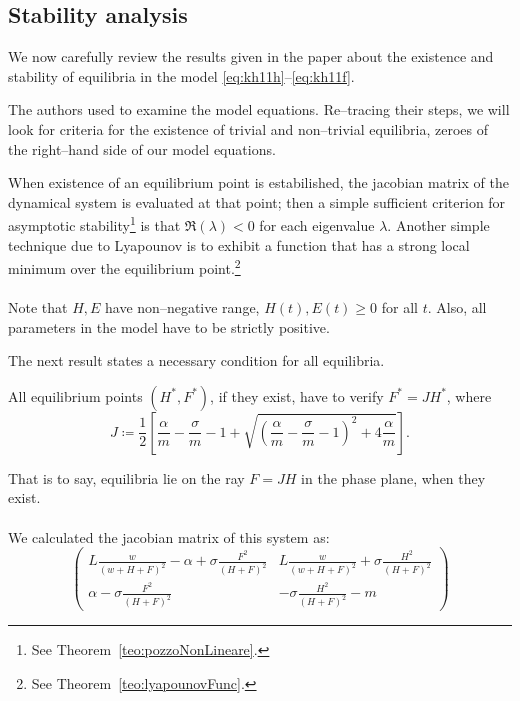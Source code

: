 \subsection{Stability analysis}
We now carefully review the results given in the paper about the existence and stability of equilibria in the model \eqref{eq:kh11h}--\eqref{eq:kh11f}.

The authors used  to examine the model equations.
Re--tracing their steps, we will look for criteria for the existence of trivial and non--trivial equilibria, \ie zeroes of the right--hand side of our model equations.

When existence of an equilibrium point is estabilished, the jacobian matrix of the dynamical system is
evaluated at that point; then a simple sufficient criterion for asymptotic
stability\footnote{See Theorem~\ref{teo:pozzoNonLineare}.}
is that $\Re (\lambda) < 0$ for each eigenvalue $\lambda$.
Another simple technique due to Lyapounov is to exhibit a function that has a strong local minimum
over the equilibrium point.\footnote{See Theorem~\ref{teo:lyapounovFunc}.}

\paragraph{}
Note that $H, E$ have non--negative range, \ie $H(t), E(t) \geq 0$ for all $t$.
Also, all parameters in the model have to be strictly positive.

The next result states a necessary condition for all equilibria.

\begin{lemma}
    \label{lem:necessJ}
    All equilibrium points $(H^*, F^*)$, if they exist, have to verify $F^* = J H^*$, where
    \begin{equation}
        J \coloneq \frac{1}{2} \left[
            \frac{\alpha}{m} - \frac{\sigma}{m} - 1 +
            \sqrt{ {\left( \frac{\alpha}{m} - \frac{\sigma}{m} - 1 \right)}^2
                + 4 \frac{\alpha}{m}
            }
        \right].
        \label{eq:kh11posEqJ}
    \end{equation}
\end{lemma}

That is to say, equilibria lie on the ray $F= JH$ in the phase plane, when they exist.

\paragraph{}
We calculated the jacobian matrix of this system as:
\begin{equation}
    \begin{pmatrix}
        L \frac{w}{{(w + H + F)}^2} - \alpha + \sigma \frac{F^2}{{(H+F)}^2} &
        L \frac{w}{{(w + H + F)}^2} + \sigma \frac{H^2}{{(H+F)}^2}
        \\
        \alpha - \sigma \frac{F^2}{{(H+F)}^2} &
        - \sigma \frac{H^2}{{(H+F)}^2} - m
    \end{pmatrix}
    \label{eq:jacoGeneral}
\end{equation}

